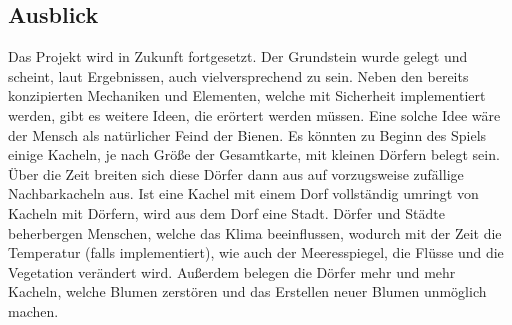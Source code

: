 \subsection{Ausblick}
Das Projekt wird in Zukunft fortgesetzt. Der Grundstein wurde gelegt und scheint, laut Ergebnissen, auch vielversprechend zu sein. Neben den bereits konzipierten Mechaniken und Elementen, welche mit Sicherheit implementiert werden, gibt es weitere Ideen, die erörtert werden müssen. Eine solche Idee wäre der Mensch als natürlicher Feind der Bienen. Es könnten zu Beginn des Spiels einige Kacheln, je nach Größe der Gesamtkarte, mit kleinen Dörfern belegt sein. Über die Zeit breiten sich diese Dörfer dann aus auf vorzugsweise zufällige Nachbarkacheln aus. Ist eine Kachel mit einem Dorf vollständig umringt von Kacheln mit Dörfern, wird aus dem Dorf eine Stadt. Dörfer und Städte beherbergen Menschen, welche das Klima beeinflussen, wodurch mit der Zeit die Temperatur (falls implementiert), wie auch der Meeresspiegel, die Flüsse und die Vegetation verändert wird. Außerdem belegen die Dörfer mehr und mehr Kacheln, welche Blumen zerstören und das Erstellen neuer Blumen unmöglich machen. 